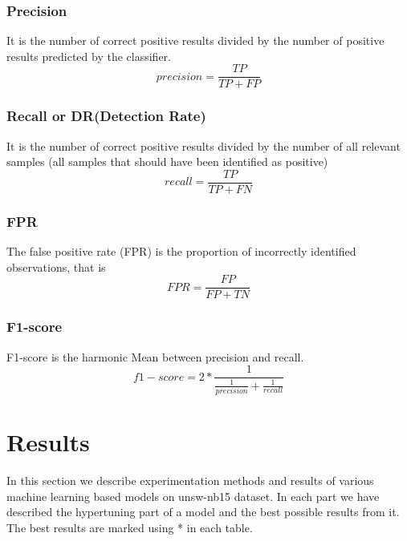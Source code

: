\documentclass[14pt, conference]{IEEEtran}
\begin{document}
\subsubsection{Precision}
It is the number of correct positive results divided by the number of positive results predicted by the classifier.
\begin{equation}
    precision = \frac{TP}{TP+FP}
\end{equation}

\subsubsection{Recall or DR(Detection Rate)}
It is the number of correct positive results divided by the number of all relevant samples (all samples that should have been identified as positive)
\begin{equation}
    recall = \frac{TP}{TP+FN}
\end{equation}

\subsubsection{FPR}
The false positive rate (FPR) is the proportion of incorrectly identified observations, that is 
\begin{equation}
    FPR = \frac{FP}{FP+TN}
\end{equation}

\subsubsection{F1-score}
F1-score is the harmonic Mean between precision and recall.
\begin{equation}
    f1-score = 2 * \frac{1}{\frac{1}{precision}+ \frac{1}{recall}}
\end{equation}




%
\section{Results }\label{results}
In this section we describe experimentation methods and results of various machine learning based models on unsw-nb15 dataset. In each part we have described the hypertuning part of a model and the best possible results from it. The best results are marked using * in each table.\\
\end{document}
